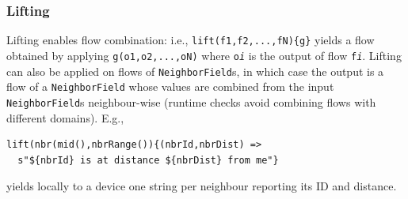 \subsubsection{Lifting} 
%
%
%
Lifting enables flow combination: i.e.,
 \lstinline|lift(f1,f2,...,fN){g}|
 yields a flow obtained by applying \texttt{g(o1,o2,...,oN)} where \texttt{o\emph{i}} is the output of flow \texttt{f\emph{i}}.
%
Lifting can also be applied on flows of \lstinline|NeighborField|s,
in which case
the output is a flow of a \lstinline|NeighborField|
whose values are combined from the input \lstinline|NeighborField|s neighbour-wise (runtime checks avoid combining flows with different domains).
%
E.g.,
\begin{lstlisting}
lift(nbr(mid(),nbrRange()){(nbrId,nbrDist) =>
  s"${nbrId} is at distance ${nbrDist} from me"}
\end{lstlisting}
%
yields locally to a device one string per neighbour reporting its ID and distance.

